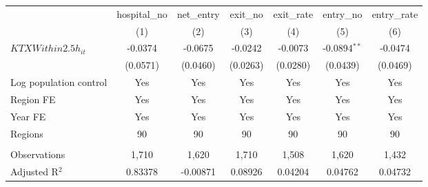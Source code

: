\begingroup
\centering
\begin{tabular}{lcccccc}
   \toprule
                          & hospital\_no  & net\_entry  & exit\_no  & exit\_rate  & entry\_no      & entry\_rate \\    
                          & (1)           & (2)         & (3)       & (4)         & (5)            & (6)\\  
   \midrule 
   $KTXWithin2.5h_{it}$   & -0.0374       & -0.0675     & -0.0242   & -0.0073     & -0.0894$^{**}$ & -0.0474\\   
                          & (0.0571)      & (0.0460)    & (0.0263)  & (0.0280)    & (0.0439)       & (0.0469)\\   
   Log population control & Yes           & Yes         & Yes       & Yes         & Yes            & Yes\\  
   Region FE              & Yes           & Yes         & Yes       & Yes         & Yes            & Yes\\  
   Year FE                & Yes           & Yes         & Yes       & Yes         & Yes            & Yes\\  
   Regions                & 90            & 90          & 90        & 90          & 90             & 90\\  
    \\
   Observations           & 1,710         & 1,620       & 1,710     & 1,508       & 1,620          & 1,432\\  
   Adjusted R$^2$         & 0.83378       & -0.00871    & 0.08926   & 0.04204     & 0.04762        & 0.04732\\  
   \bottomrule
\end{tabular}
\par\endgroup
